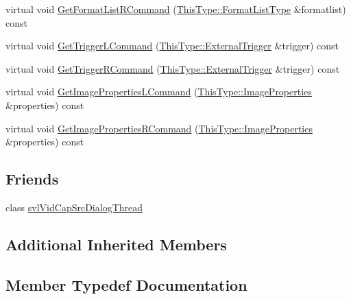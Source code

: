 \begin{DoxyCompactItemize}
\item 
virtual void \hyperlink{classsvl_filter_source_video_capture_a9e0816d82331d49ca668c520e0b6f08b}{Get\+Format\+List\+R\+Command} (\hyperlink{classsvl_filter_source_video_capture_af6d31bdf8807755322cd7e5ef1f0d8d9}{This\+Type\+::\+Format\+List\+Type} \&formatlist) const 
\item 
virtual void \hyperlink{classsvl_filter_source_video_capture_ae425165fad79636ee1c44dc67f10d6ed}{Get\+Trigger\+L\+Command} (\hyperlink{classsvl_filter_source_video_capture_a609a8eb75ea23b7b35068207cc3c3144}{This\+Type\+::\+External\+Trigger} \&trigger) const 
\item 
virtual void \hyperlink{classsvl_filter_source_video_capture_a0ad2bb0c7ecedf0cf3db911764c92257}{Get\+Trigger\+R\+Command} (\hyperlink{classsvl_filter_source_video_capture_a609a8eb75ea23b7b35068207cc3c3144}{This\+Type\+::\+External\+Trigger} \&trigger) const 
\item 
virtual void \hyperlink{classsvl_filter_source_video_capture_a29d406f7888ac42962c86edc507c7f98}{Get\+Image\+Properties\+L\+Command} (\hyperlink{classsvl_filter_source_video_capture_ad5d8ccc6a284be386d49b60574937f4d}{This\+Type\+::\+Image\+Properties} \&properties) const 
\item 
virtual void \hyperlink{classsvl_filter_source_video_capture_a5b1dd1a254e7425ce53539e909a49e53}{Get\+Image\+Properties\+R\+Command} (\hyperlink{classsvl_filter_source_video_capture_ad5d8ccc6a284be386d49b60574937f4d}{This\+Type\+::\+Image\+Properties} \&properties) const 
\end{DoxyCompactItemize}
\subsection*{Friends}
\begin{DoxyCompactItemize}
\item 
class \hyperlink{classsvl_filter_source_video_capture_aa65165c939d276c4378a32c5405f83d4}{svl\+Vid\+Cap\+Src\+Dialog\+Thread}
\end{DoxyCompactItemize}
\subsection*{Additional Inherited Members}


\subsection{Member Typedef Documentation}
\hypertarget{classsvl_filter_source_video_capture_ac541a625ce316b5320170cef3ca02277}{}
